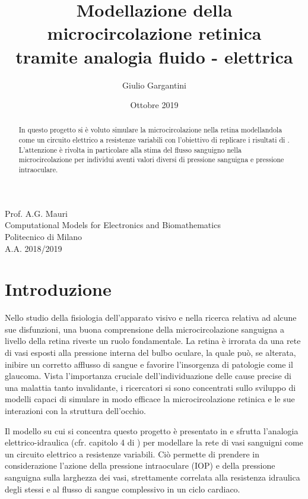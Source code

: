 \documentclass{article}
\title{Modellazione della microcircolazione retinica\\tramite analogia fluido - elettrica} %
\author{Giulio Gargantini} %
\date{Ottobre 2019} %
\begin{document}
\maketitle %

\begin{center}
Prof. A.G. Mauri \\
Computational Models for Electronics and Biomathematics\\
Politecnico di Milano\\
A.A. 2018/2019
\end{center}

\begin{abstract}
In questo progetto si è voluto simulare la microcircolazione nella retina modellandola come un circuito elettrico a resistenze variabili con l'obiettivo di replicare i risultati di \cite{art1}.
L'attenzione è rivolta in particolare alla stima del flusso sanguigno nella microcircolazione per individui aventi valori diversi di pressione sanguigna e pressione intraoculare.
\end{abstract}

\tableofcontents
\newpage

\section{Introduzione}
Nello studio della fisiologia dell'apparato visivo e nella ricerca relativa ad alcune sue disfunzioni, una buona comprensione della microcircolazione sanguigna a livello della retina riveste un ruolo fondamentale.
La retina è irrorata da una rete di vasi esposti alla pressione interna del bulbo oculare, la quale può, se alterata, inibire un corretto afflusso di sangue e favorire l'insorgenza di patologie come il glaucoma.
Vista l'importanza cruciale dell'individuazione delle cause precise di una malattia tanto invalidante, i ricercatori si sono concentrati sullo sviluppo di modelli capaci di simulare in modo efficace la microcircolazione retinica e le sue interazioni con la struttura dell'occhio.

Il modello su cui si concentra questo progetto è presentato in \cite{art1} e sfrutta l'analogia elettrico-idraulica (cfr. capitolo 4 di \cite{notes}) per modellare la rete di vasi sanguigni come un circuito elettrico a resistenze variabili.
Ciò permette di prendere in considerazione l'azione della pressione intraoculare (IOP) e della pressione sanguigna sulla larghezza dei vasi, strettamente correlata alla resistenza idraulica degli stessi e al flusso di sangue complessivo in un ciclo cardiaco.
\end{document}
